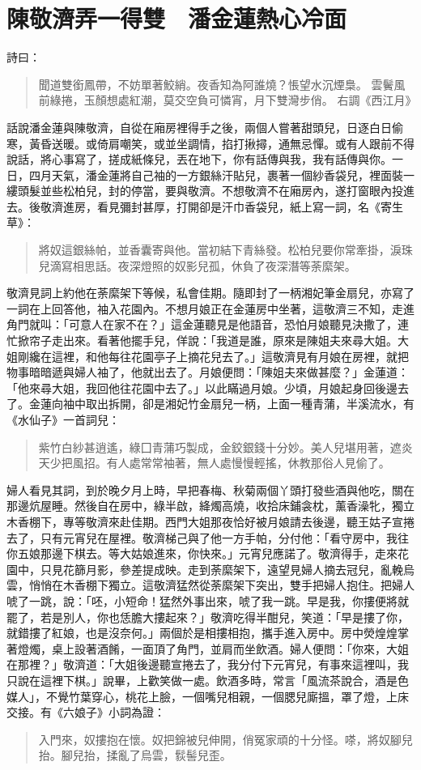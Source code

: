 
\chapter{陳敬濟弄一得雙　潘金蓮熱心冷面}

詩曰：
\begin{quote}
聞道雙銜鳳帶，不妨單著鮫綃。夜香知為阿誰燒？悵望水沉煙梟。
雲鬢風前綠捲，玉顏想處紅潮，莫交空負可憐宵，月下雙灣步俏。
右調《西江月》
\end{quote}

話說潘金蓮與陳敬濟，自從在廂房裡得手之後，兩個人嘗著甜頭兒，日逐白日偷寒，黃昏送暖。或倚肩嘲笑，或並坐調情，掐打揪撏，通無忌憚。或有人跟前不得說話，將心事寫了，搓成紙條兒，丟在地下，你有話傳與我，我有話傳與你。一日，四月天氣，潘金蓮將自己袖的一方銀絲汗貼兒，裹著一個紗香袋兒，裡面裝一縷頭髮並些松柏兒，封的停當，要與敬濟。不想敬濟不在廂房內，遂打窗眼內投進去。後敬濟進房，看見彌封甚厚，打開卻是汗巾香袋兒，紙上寫一詞，名《寄生草》：
\begin{quote}
將奴這銀絲帕，並香囊寄與他。當初結下青絲發。松柏兒要你常牽掛，淚珠兒滴寫相思話。夜深燈照的奴影兒孤，休負了夜深潛等荼縻架。
\end{quote}

敬濟見詞上約他在荼縻架下等候，私會佳期。隨即封了一柄湘妃筆金扇兒，亦寫了一詞在上回答他，袖入花園內。不想月娘正在金蓮房中坐著，這敬濟三不知，走進角門就叫：「可意人在家不在？」這金蓮聽見是他語音，恐怕月娘聽見決撒了，連忙掀帘子走出來。看著他擺手兒，佯說：「我道是誰，原來是陳姐夫來尋大姐。大姐剛纔在這裡，和他每往花園亭子上摘花兒去了。」這敬濟見有月娘在房裡，就把物事暗暗遞與婦人袖了，他就出去了。月娘便問：「陳姐夫來做甚麼？」金蓮道：「他來尋大姐，我回他往花園中去了。」以此瞞過月娘。少頃，月娘起身回後邊去了。金蓮向袖中取出拆開，卻是湘妃竹金扇兒一柄，上面一種青蒲，半溪流水，有《水仙子》一首詞兒：
\begin{quote}
紫竹白紗甚逍遙，綠囗青蒲巧製成，金鉸銀錢十分妙。美人兒堪用著，遮炎天少把風招。有人處常常袖著，無人處慢慢輕搖，休教那俗人見偷了。
\end{quote}

婦人看見其詞，到於晚夕月上時，早把春梅、秋菊兩個丫頭打發些酒與他吃，關在那邊炕屋睡。然後自在房中，綠半啟，絳燭高燒，收拾床鋪衾枕，薰香澡牝，獨立木香棚下，專等敬濟來赴佳期。西門大姐那夜恰好被月娘請去後邊，聽王姑子宣捲去了，只有元宵兒在屋裡。敬濟梯己與了他一方手帕，分付他：「看守房中，我往你五娘那邊下棋去。等大姑娘進來，你快來。」元宵兒應諾了。敬濟得手，走來花園中，只見花篩月影，參差提成映。走到荼縻架下，遠望見婦人摘去冠兒，亂輓烏雲，悄悄在木香棚下獨立。這敬濟猛然從荼縻架下突出，雙手把婦人抱住。把婦人唬了一跳，說：「呸，小短命！猛然外事出來，唬了我一跳。早是我，你摟便將就罷了，若是別人，你也恁膽大摟起來？」敬濟吃得半酣兒，笑道：「早是摟了你，就錯摟了紅娘，也是沒奈何。」兩個於是相摟相抱，攜手進入房中。房中熒煌煌掌著燈燭，桌上設著酒餚，一面頂了角門，並肩而坐飲酒。婦人便問：「你來，大姐在那裡？」敬濟道：「大姐後邊聽宣捲去了，我分付下元宵兒，有事來這裡叫，我只說在這裡下棋。」說畢，上歡笑做一處。飲酒多時，常言「風流茶說合，酒是色媒人」，不覺竹葉穿心，桃花上臉，一個嘴兒相親，一個腮兒廝搵，罩了燈，上床交接。有《六娘子》小詞為證：
\begin{quote}
入門來，奴摟抱在懷。奴把錦被兒伸開，俏冤家頑的十分怪。嗏，將奴腳兒抬。腳兒抬，揉亂了烏雲，䯼髻兒歪。
\end{quote}

